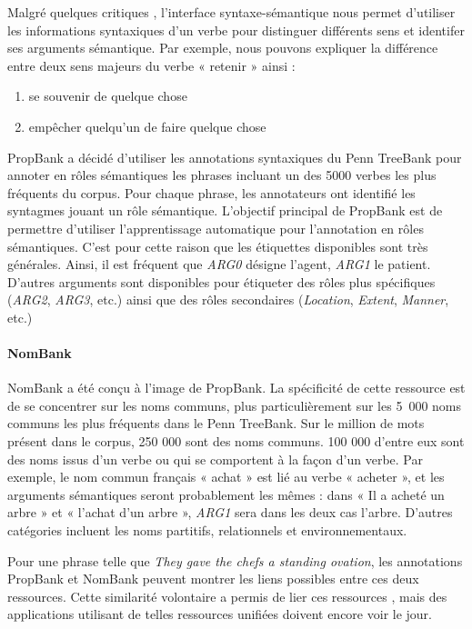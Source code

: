Malgré quelques critiques \citep{riemer2011conception}, l'interface
syntaxe-sémantique nous permet d'utiliser les informations syntaxiques d'un
verbe pour distinguer différents sens et identifer ses arguments sémantique.
Par exemple, nous pouvons expliquer la différence entre deux sens majeurs du
verbe « retenir » ainsi :

\begin{enumerate}
    \item se souvenir de quelque chose
    \item empêcher quelqu'un de faire quelque chose
\end{enumerate}

PropBank \citep{palmer2005proposition} a décidé d'utiliser les annotations
syntaxiques du Penn TreeBank \citep{marcus1993building} pour annoter en rôles
sémantiques les phrases incluant un des 5000 verbes les plus fréquents du
corpus. Pour chaque phrase, les annotateurs ont identifié les syntagmes jouant
un rôle sémantique. L'objectif principal de PropBank est de permettre
d'utiliser l'apprentissage automatique pour l'annotation en rôles sémantiques.
C'est pour cette raison que les étiquettes disponibles sont très générales.
Ainsi, il est fréquent que \textit{ARG0} désigne l'agent, \textit{ARG1} le
patient. D'autres arguments sont disponibles pour étiqueter des rôles plus
spécifiques (\textit{ARG2}, \textit{ARG3}, etc.) ainsi que des rôles
secondaires (\textit{Location}, \textit{Extent}, \textit{Manner}, etc.)

\paragraph{NomBank}

NomBank \citep{meyers2004nombank} a été conçu à l'image de PropBank. La
spécificité de cette ressource est de se concentrer sur les noms communs, plus
particulièrement sur les 5~000 noms communs les plus fréquents dans le Penn
TreeBank. Sur le million de mots présent dans le corpus, 250 000 sont des noms
communs. 100 000 d'entre eux sont des noms issus d'un verbe ou qui se
comportent à la façon d'un verbe. Par exemple, le nom commun français « achat »
est lié au verbe « acheter », et les arguments sémantiques seront probablement
les mêmes : dans « Il a acheté un arbre » et « l'achat d'un arbre »,
\textit{ARG1} sera dans les deux cas l'arbre. D'autres catégories incluent les
noms partitifs, relationnels et environnementaux.

Pour une phrase telle que \emph{They gave the chefs a standing ovation}, les
annotations PropBank et NomBank peuvent montrer les liens possibles entre ces
deux ressources. Cette similarité volontaire a permis de lier ces ressources
\citep{pustejovsky2005merging,verhagen2007combining}, mais des applications
utilisant de telles ressources unifiées doivent encore voir le jour.

